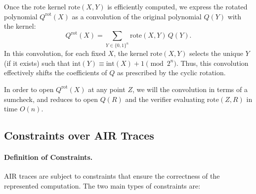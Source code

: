 \documentclass{article}
\begin{document}
Once the rote kernel \(\text{rote}(X,Y)\) is efficiently computed, we express the rotated polynomial \(Q^{\text{rot}}(X)\) as a convolution of the original polynomial \(Q(Y)\) with the kernel:
\[
Q^{\text{rot}}(X) = \sum_{Y \in \{0,1\}^n} \text{rote}(X,Y)\, Q(Y).
\]
In this convolution, for each fixed \(X\), the kernel \(\text{rote}(X,Y)\) selects the unique \(Y\) (if it exists) such that \(\text{int}(Y) \equiv \text{int}(X)+1 \pmod{2^n}\). Thus, this convolution effectively shifts the coefficients of \(Q\) as prescribed by the cyclic rotation. 

In order to open $Q^{\text{rot}}(X)$ at any point $Z$, we will the convolution in terms of a sumcheck, and reduces to open $Q(R)$ and the verifier evaluating $\text{rote}(Z,R)$ in time \(O(n)\).




\subsection{Constraints over AIR Traces}

\paragraph{Definition of Constraints.} AIR traces are subject to constraints that ensure the correctness of the represented computation. The two main types of constraints are:
\end{document}
